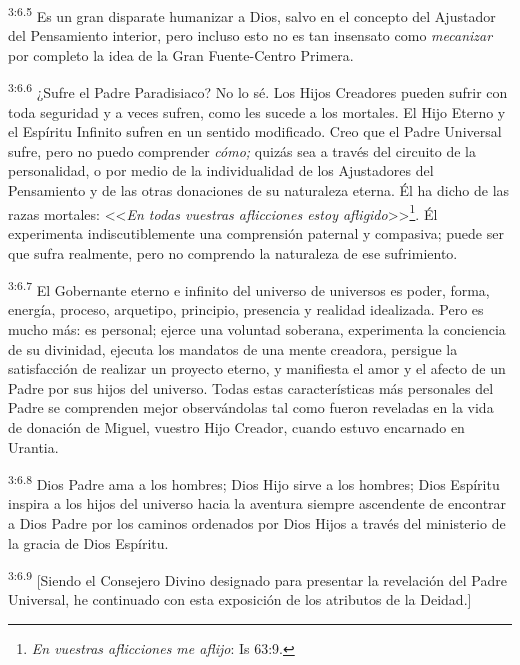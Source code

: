\par
\textsuperscript{3:6.5} Es un gran disparate humanizar a Dios, salvo en el concepto del Ajustador del Pensamiento interior, pero incluso esto no es tan insensato como \textit{mecanizar} por completo la idea de la Gran Fuente-Centro Primera.

\par
\textsuperscript{3:6.6} ¿Sufre el Padre Paradisiaco? No lo sé. Los Hijos Creadores pueden sufrir con toda seguridad y a veces sufren, como les sucede a los mortales. El Hijo Eterno y el Espíritu Infinito sufren en un sentido modificado. Creo que el Padre Universal sufre, pero no puedo comprender \textit{cómo;} quizás sea a través del circuito de la personalidad, o por medio de la individualidad de los Ajustadores del Pensamiento y de las otras donaciones de su naturaleza eterna. Él ha dicho de las razas mortales: <<\textit{En todas vuestras aflicciones estoy afligido}>>\footnote{\textit{En vuestras aflicciones me aflijo}: Is 63:9.}. Él experimenta indiscutiblemente una comprensión paternal y compasiva; puede ser que sufra realmente, pero no comprendo la naturaleza de ese sufrimiento.

\par
\textsuperscript{3:6.7} El Gobernante eterno e infinito del universo de universos es poder, forma, energía, proceso, arquetipo, principio, presencia y realidad idealizada. Pero es mucho más: es personal; ejerce una voluntad soberana, experimenta la conciencia de su divinidad, ejecuta los mandatos de una mente creadora, persigue la satisfacción de realizar un proyecto eterno, y manifiesta el amor y el afecto de un Padre por sus hijos del universo. Todas estas características más personales del Padre se comprenden mejor observándolas tal como fueron reveladas en la vida de donación de Miguel, vuestro Hijo Creador, cuando estuvo encarnado en Urantia.

\par
\textsuperscript{3:6.8} Dios Padre ama a los hombres; Dios Hijo sirve a los hombres; Dios Espíritu inspira a los hijos del universo hacia la aventura siempre ascendente de encontrar a Dios Padre por los caminos ordenados por Dios Hijos a través del ministerio de la gracia de Dios Espíritu.

\par
\textsuperscript{3:6.9} [Siendo el Consejero Divino designado para presentar la revelación del Padre Universal, he continuado con esta exposición de los atributos de la Deidad.]